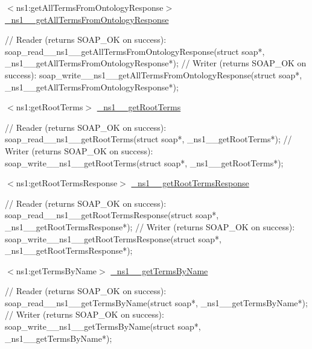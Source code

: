 \begin{DoxyItemize}
\item $<$ns1:getAllTermsFromOntologyResponse$>$ \hyperlink{class__ns1____getAllTermsFromOntologyResponse}{\_\-ns1\_\-\_\-getAllTermsFromOntologyResponse} 
\begin{DoxyCode}
    // Reader (returns SOAP_OK on success):
    soap_read__ns1__getAllTermsFromOntologyResponse(struct soap*, 
      _ns1__getAllTermsFromOntologyResponse*);
    // Writer (returns SOAP_OK on success):
    soap_write__ns1__getAllTermsFromOntologyResponse(struct soap*, 
      _ns1__getAllTermsFromOntologyResponse*);
\end{DoxyCode}

\end{DoxyItemize}


\begin{DoxyItemize}
\item $<$ns1:getRootTerms$>$ \hyperlink{class__ns1____getRootTerms}{\_\-ns1\_\-\_\-getRootTerms} 
\begin{DoxyCode}
    // Reader (returns SOAP_OK on success):
    soap_read__ns1__getRootTerms(struct soap*, _ns1__getRootTerms*);
    // Writer (returns SOAP_OK on success):
    soap_write__ns1__getRootTerms(struct soap*, _ns1__getRootTerms*);
\end{DoxyCode}

\end{DoxyItemize}


\begin{DoxyItemize}
\item $<$ns1:getRootTermsResponse$>$ \hyperlink{class__ns1____getRootTermsResponse}{\_\-ns1\_\-\_\-getRootTermsResponse} 
\begin{DoxyCode}
    // Reader (returns SOAP_OK on success):
    soap_read__ns1__getRootTermsResponse(struct soap*, 
      _ns1__getRootTermsResponse*);
    // Writer (returns SOAP_OK on success):
    soap_write__ns1__getRootTermsResponse(struct soap*, 
      _ns1__getRootTermsResponse*);
\end{DoxyCode}

\end{DoxyItemize}


\begin{DoxyItemize}
\item $<$ns1:getTermsByName$>$ \hyperlink{class__ns1____getTermsByName}{\_\-ns1\_\-\_\-getTermsByName} 
\begin{DoxyCode}
    // Reader (returns SOAP_OK on success):
    soap_read__ns1__getTermsByName(struct soap*, _ns1__getTermsByName*);
    // Writer (returns SOAP_OK on success):
    soap_write__ns1__getTermsByName(struct soap*, _ns1__getTermsByName*);
\end{DoxyCode}

\end{DoxyItemize}


